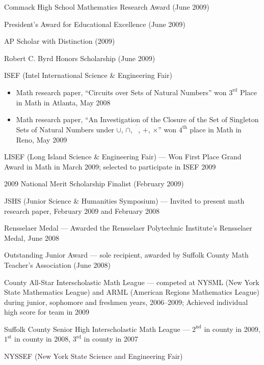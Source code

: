 \documentclass [11pt]{res}
\begin{document}
\begin {itemize}
{        Commack High School Mathematics Research Award (June 2009)
      \item
        President's Award for Educational Excellence (June 2009)
      \item
        AP Scholar with Distinction (2009)
      \item
        Robert C. Byrd Honors Scholarship (June 2009)
      \item
        ISEF (Intel International Science \& Engineering Fair)
        \begin{itemize}
          \item
            Math research paper, ``Circuits over Sets of Natural Numbers'' won $3^\text{rd}$ Place in Math in Atlanta, May 2008
          \item
            Math research paper, ``An Investigation of the Closure of the Set of Singleton Sets of Natural Numbers under $\cup$, $\cap$, $\overline{\phantom{\emptyset}}$, $+$, $\times$'' won $4^\text{th}$ place in Math in Reno, May 2009
       \end{itemize}
      \item
        LISEF (Long Island Science \& Engineering Fair) --- Won First Place Grand Award in Math in March 2009; selected to participate in ISEF 2009
      \item
        2009 National Merit Scholarship Finalist (February 2009)
      \item
        JSHS (Junior Science \& Humanities Symposium) --- Invited to present math research paper, February 2009 and February 2008
      \item
        Rensselaer Medal --- Awarded the Rensselaer Polytechnic Institute's Rensselaer Medal, June 2008
      \item
        Outstanding Junior Award --- sole recipient, awarded by Suffolk County Math Teacher's Association (June 2008)
      \item
        County All-Star Interscholastic Math League --- competed at NYSML (New York State Mathematics League) and ARML (American Regions Mathematics League) during junior, sophomore and freshmen years, 2006--2009; Achieved individual high score for team in 2009
      \item
        Suffolk County Senior High Interscholastic Math League --- $2^\text{nd}$ in county in 2009, $1^\text{st}$ in county in 2008, $3^\text{rd}$ in county in 2007
      \item
        NYSSEF (New York State Science and Engineering Fair)
        \begin{itemize}

\end{itemize}}
\end{itemize}
\end{document}
